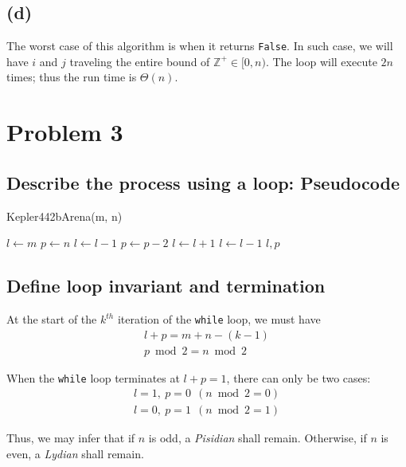 \documentclass[12pt]{article}
\newcommand{\inlinecode}{\texttt}
\begin{document}
\subsection{(d)}
The worst case of this algorithm is when it returns \inlinecode{False}. In such case, we will have $i$ and $j$ traveling the entire bound of $\mathbb{Z^+} \in [0, n)$. The loop will execute $2n$ times; thus the run time is $\Theta(n)$.

\section{Problem 3}
\subsection{Describe the process using a loop: Pseudocode}

\begin{algorithm}
\caption{Kepler442bArena(m, n)}\label{Kepler442b}
\begin{algorithmic}[1]
\Procedure{}{}
\State $l \gets m$
\State $p \gets n$
    \State {}
        \State $l \gets l - 1$
        \State $p \gets p - 2$
        \State $l \gets l + 1$
    \Else
        \State $l \gets l - 1$
    \EndIf
\EndWhile
\State \Return $l, p$
\EndProcedure
\end{algorithmic}
\end{algorithm}

\subsection{Define loop invariant and termination}
At the start of the $k^{th}$ iteration of the \inlinecode{while} loop, we must have
\begin{gather}
    l + p = m + n - (k - 1) \\
    p\bmod 2 = n \bmod 2
\end{gather}

When the \inlinecode{while} loop terminates at $l + p = 1$, there can only be two cases:
\begin{gather}
    l = 1, \ p = 0 \ \ (n \bmod 2 = 0) \\
    l = 0, \ p = 1 \ \ (n \bmod 2 = 1)
\end{gather}

Thus, we may infer that if $n$ is odd, a \textit{Pisidian} shall remain. Otherwise, if $n$ is even, a \textit{Lydian} shall remain.
\end{document}
